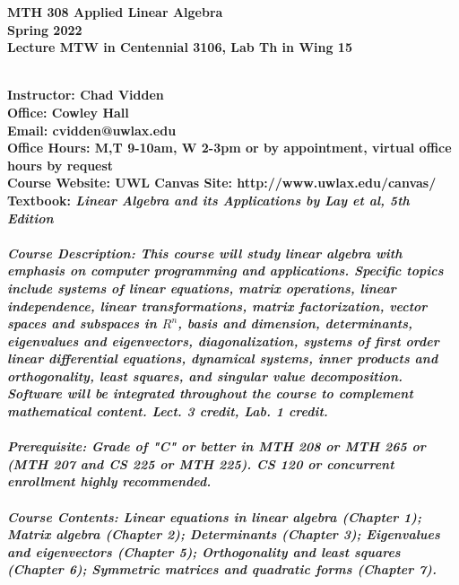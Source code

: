 \documentclass [11pt]{article}
\begin{document}
\begin {center}
\Large \bfseries MTH 308
Applied Linear Algebra \normalfont \normalsize \\
Spring 2022 \\
{\bf Lecture} MTW in Centennial 3106, {\bf Lab} Th in Wing 15
\end {center}
\ \\
\noindent
\bfseries Instructor: \normalfont Chad Vidden \\
\bfseries Office:  Cowley Hall \\
\bfseries Email: \normalfont cvidden@uwlax.edu \\
\bfseries Office Hours: \normalfont M,T 9-10am, W 2-3pm or by appointment, virtual office hours by request \normalfont  \\
\bfseries Course Website: \normalfont UWL Canvas Site: http://www.uwlax.edu/canvas/\\
\bfseries Textbook: \normalfont \itshape Linear Algebra and its Applications by Lay et al, 5th Edition \normalfont \\
\ \\
\bfseries Course Description: \normalfont This course will study linear algebra with emphasis on computer programming and applications. Specific topics include systems of linear equations, matrix operations, linear independence, linear transformations, matrix factorization, vector spaces and subspaces in $R^n$, basis and dimension, determinants, eigenvalues and eigenvectors, diagonalization, systems of first order linear differential equations, dynamical systems, inner products and orthogonality, least squares, and singular value decomposition. Software will be integrated throughout the course to complement mathematical content. Lect. 3 credit, Lab. 1 credit. \\ \ \\
\bfseries Prerequisite: \normalfont
Grade of "C" or better in MTH 208 or MTH 265 or (MTH 207 and CS 225 or MTH 225). CS 120 or concurrent enrollment highly recommended. \\
\ \\
\bfseries Course Contents: \normalfont Linear equations in linear algebra (Chapter 1);  Matrix algebra (Chapter 2);  Determinants (Chapter 3);  Eigenvalues and eigenvectors (Chapter 5); Orthogonality and least squares (Chapter 6);  Symmetric matrices and quadratic forms (Chapter 7). \\
\end{document}
